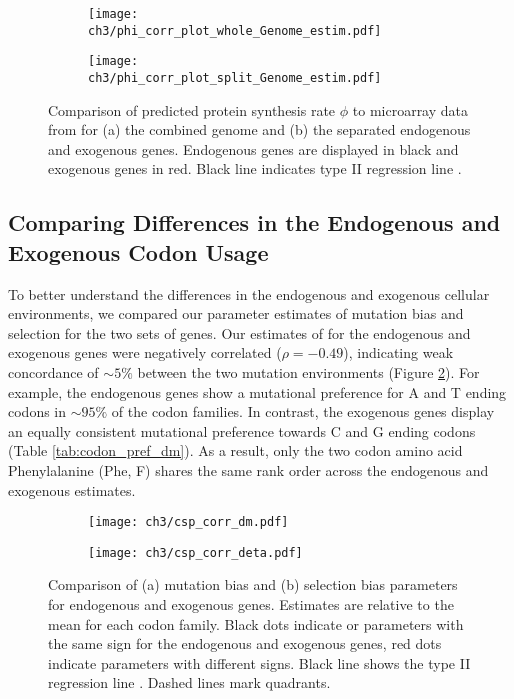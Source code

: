 \begin{figure}
    \centering
    \begin{subfigure}
        \centering
        \texttt{[image: ch3/phi\_corr\_plot\_whole\_Genome\_estim.pdf]}
    \end{subfigure}
    \begin{subfigure}
        \centering
        \texttt{[image: ch3/phi\_corr\_plot\_split\_Genome\_estim.pdf]}
    \end{subfigure}
    \caption{Comparison of predicted protein synthesis rate $\phi$ to microarray data from \citet{tsankov2010} for (a) the combined genome and (b) the separated endogenous and exogenous genes. 
    Endogenous genes are displayed in black and exogenous genes in red. Black line indicates type II regression line \citep{SokalAndRohlf1981}.}
    \label{fig:phi_corr_two_cond}
\end{figure}


\subsection{Comparing Differences in the Endogenous and Exogenous Codon Usage}
To better understand the differences in the endogenous and exogenous cellular environments, we compared our parameter estimates of mutation bias \DM and selection \DE for the two sets of genes.
Our estimates of \DM for the endogenous and exogenous genes were negatively correlated ($\rho = -0.49$),  indicating weak concordance of $\sim5\%$ between the two mutation environments (Figure \ref{fig:csp_comp}).
For example, the endogenous genes show a mutational preference for A and T ending codons in $\sim95\%$ of the codon families.
In contrast, the exogenous genes display an equally consistent mutational preference towards C and G ending codons (Table \ref{tab:codon_pref_dm}).
As a result, only the two codon amino acid Phenylalanine (Phe, F) shares the same rank order across the endogenous and exogenous \DM estimates.

\begin{figure}
    \centering
    \begin{subfigure}
        \centering
        \texttt{[image: ch3/csp\_corr\_dm.pdf]}
    \end{subfigure}
    \begin{subfigure}
        \centering
        \texttt{[image: ch3/csp\_corr\_deta.pdf]}
    \end{subfigure}
    \caption{Comparison of (a) mutation bias \DM and (b) selection bias \DE parameters for endogenous and exogenous genes.
      Estimates are relative to the mean for each codon family.
      Black dots indicate \DM or \DE parameters with the same sign for the endogenous and exogenous genes, red dots indicate parameters with different signs.
      Black line shows the type II regression line \citep{SokalAndRohlf1981}.
      Dashed lines mark quadrants.}
    \label{fig:csp_comp}
\end{figure}

